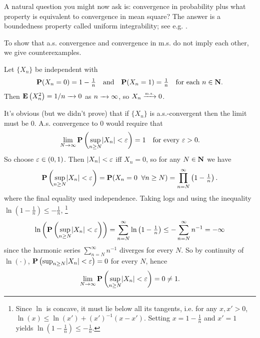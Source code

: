 \documentclass[11pt,letterpaper,reqno,oneside]{article}
\begin{document}
A natural question you might now ask is: convergence in probability plus what property is equivalent to convergence in mean square? The answer is a boundedness property called uniform integrability; see e.g. \textcite[][sec. 13.7]{Williams1991}.


To show that a.s. convergence and convergence in m.s. do not imply each other, we give counterexamples.

\begin{example}
	Let $\{ X_n \}$ be independent with
	\begin{equation*}
		\mathbf{P}(X_n=0) = 1-\tfrac{1}{n} 
		\quad\text{and}\quad
		\mathbf{P}(X_n=1) = \tfrac{1}{n}
		\quad\text{for each $n \in \mathbf{N}$.}
	\end{equation*}
	Then $\mathbf{E}\left( X_n^2 \right) = 1/n \xrightarrow{\;\;\;} 0$ as $n\xrightarrow{\;\;\;}\infty$, so $X_n \xrightarrow{{\scriptscriptstyle \mathrm{m.s.}}} 0$.

	It's obvious (but we didn't prove) that if $\{ X_n \}$ is a.s.-convergent then the limit must be $0$. A.s. convergence to $0$ would require that
	\begin{equation*}
		\lim_{N\to\infty} \mathbf{P}\left( \sup_{n \geq N} \lvert X_n\rvert < \varepsilon \right) = 1 
		\quad\text{for every $\varepsilon>0$.}
	\end{equation*}
	So choose $\varepsilon \in (0,1)$. Then $\lvert X_n\rvert<\varepsilon$ iff $X_n=0$, so for any $N \in \mathbf{N}$ we have
	\begin{equation*}
		\mathbf{P}\left( \sup_{n \geq N} \lvert X_n\rvert < \varepsilon \right)
		= \mathbf{P}( X_n=0 \;\;\forall n \geq N )
		= \prod_{n=N}^\infty \left( 1 - \tfrac{1}{n} \right) .
	\end{equation*}
	where the final equality used independence. Taking logs and using the inequality $\ln\left(1-\tfrac{1}{n}\right) \leq -\tfrac{1}{n}$,%
		\footnote{Since $\ln$ is concave, it must lie below all its tangents, i.e. for any $x,x' >0$, $\ln(x) \leq \ln(x') + (x')^{-1} (x-x')$. Setting $x=1-\tfrac{1}{n}$ and $x'=1$ yields $\ln\left(1-\tfrac{1}{n}\right) \leq -\tfrac{1}{n}$.}
	\begin{equation*}
		\ln \left( \mathbf{P}\left( \sup_{n \geq N} \lvert X_n\rvert < \varepsilon \right) \right)
		= \sum_{n=N}^\infty \ln \left( 1 - \tfrac{1}{n} \right) 
		\leq - \sum_{n=N}^\infty n^{-1}
		= - \infty 
	\end{equation*}
	since the harmonic series $\sum_{n=N}^\infty n^{-1}$ diverges for every $N$. So by continuity of $\ln(\cdot)$, $\mathbf{P}\left( \sup_{n \geq N} \lvert X_n\rvert < \varepsilon \right)=0$ for every $N$, hence
	\begin{equation*}
		\lim_{N\to\infty} \mathbf{P}\left( \sup_{n \geq N} \lvert X_n\rvert < \varepsilon \right) 
		= 0 \neq 1 .
	\end{equation*}
\end{example}
\end{document}
